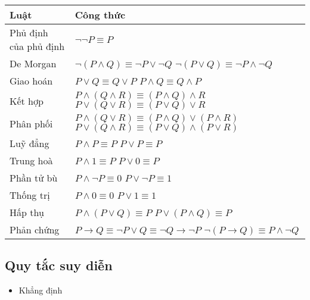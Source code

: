 \documentclass[11pt]{article}
\providecommand{\tightlist}{%
      \setlength{\itemsep}{0pt}\setlength{\parskip}{0pt}}
\begin{document}
    {\def\LTcaptype{none} %
\begin{longtable}[]{@{}
  >{\raggedright\arraybackslash}p{}
  >{\raggedright\arraybackslash}p{}@{}}
\toprule\noalign{}
\begin{minipage}[b]{\linewidth}\raggedright
\textbf{Luật}
\end{minipage} & \begin{minipage}[b]{\linewidth}\raggedright
\textbf{Công thức}
\end{minipage} \\
\midrule\noalign{}
\endhead
\bottomrule\noalign{}
\endlastfoot
Phủ định của phủ định & \(\neg \neg P \equiv P\) \\
De Morgan & \(\neg (P \land Q) \equiv \neg P \lor \neg Q\)
\(\neg (P \lor Q) \equiv \neg P \land \neg Q\) \\
Giao hoán & \(P \lor Q \equiv Q \lor P\)
\(P \land Q \equiv Q \land P\) \\
Kết hợp & \(P \land (Q \land R) \equiv (P \land Q) \land R\)
\(P \lor (Q \lor R) \equiv (P \lor Q) \lor R\) \\
Phân phối & \(P \land (Q \lor R) \equiv (P \land Q) \lor (P \land R)\)
\(P \lor (Q \land R) \equiv (P \lor Q) \land (P \lor R)\) \\
Luỹ đẳng & \(P \land P \equiv P\) \(P \lor P \equiv P\) \\
Trung hoà & \(P \land 1 \equiv P\) \(P \lor 0 \equiv P\) \\
Phần tử bù & \(P \land \neg P \equiv 0\) \(P \lor \neg P \equiv 1\) \\
Thống trị & \(P \land 0 \equiv 0\) \(P \lor 1 \equiv 1\) \\
Hấp thụ & \(P \land (P \lor Q) \equiv P\)
\(P \lor (P \land Q) \equiv P\) \\
Phản chứng & \(P \to Q \equiv \neg P \lor Q \equiv \neg Q \to \neg P\)
\(\neg (P \to Q) \equiv P \land \neg Q\) \\
\end{longtable}
}

    \subsection{Quy tắc suy diễn}\label{quy-tux1eafc-suy-diux1ec5n}

    \begin{itemize}
\tightlist
\item
  Khẳng định
\end{itemize}
\end{document}
